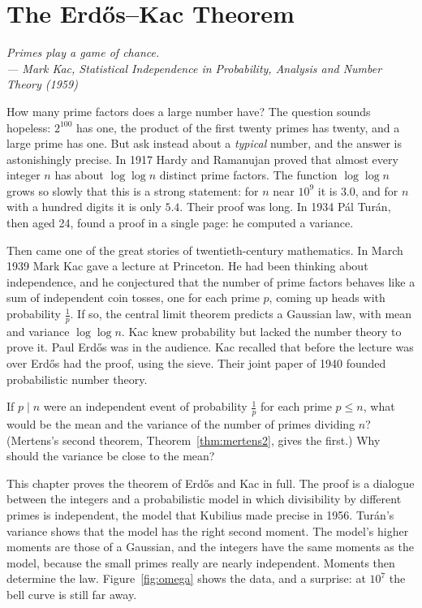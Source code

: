 \chapter{The Erd\H{o}s--Kac Theorem}

\begin{center}\itshape
Primes play a game of chance.\\
\upshape --- Mark Kac, \emph{Statistical Independence in Probability, Analysis and Number Theory} (1959)
\end{center}

How many prime factors does a large number have? The question sounds hopeless: $2^{100}$ has one, the product of the first twenty primes has twenty, and a
large prime has one. But ask instead about a \emph{typical} number, and the answer is astonishingly precise. In 1917 Hardy and Ramanujan proved that almost every
integer $n$ has about $\log\log n$ distinct prime factors. The function $\log\log n$ grows so slowly that this is a strong statement: for $n$ near $10^{9}$ it is $3.0$, and for $n$ with a
hundred digits it is only $5.4$. Their proof was long. In 1934 Pál Turán, then aged 24, found a proof in a single page: he computed a variance.

Then came one of the great stories of twentieth-century mathematics. In March 1939 Mark Kac gave a lecture at Princeton. He had been thinking about
independence, and he conjectured that the number of prime factors behaves like a sum of independent coin tosses, one for each prime $p$, coming up heads with probability
$\frac1p$. If so, the central limit theorem predicts a Gaussian law, with mean and variance $\log\log n$. Kac knew probability but lacked the number theory to prove it. Paul Erd\H{o}s was
in the audience. Kac recalled that before the lecture was over Erd\H{o}s had the proof, using the sieve. Their joint paper of 1940 founded probabilistic number theory.

\begin{think}
If $p\mid n$ were an independent event of probability $\frac1p$ for each prime $p\le n$, what would be the mean and the variance of the number of primes dividing $n$? (Mertens's second theorem,
Theorem~\ref{thm:mertens2}, gives the first.) Why should the variance be close to the mean?
\end{think}

This chapter proves the theorem of Erd\H{o}s and Kac in full. The proof is a dialogue between the integers and a probabilistic model in which divisibility by different primes is
independent, the model that Kubilius made precise in 1956. Turán's variance shows that the model has the right second moment. The model's higher moments are those of a
Gaussian, and the integers have the same moments as the model, because the small primes really are nearly independent. Moments then determine the law. Figure~\ref{fig:omega}
shows the data, and a surprise: at $10^7$ the bell curve is still far away.

